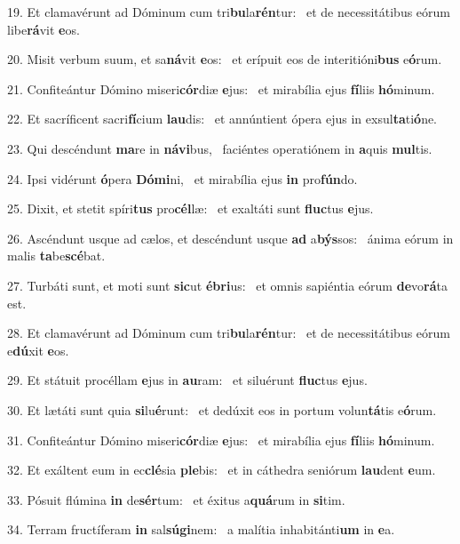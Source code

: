 19. Et clamavérunt ad Dóminum cum tri\textbf{bu}la\textbf{rén}tur: \ast\  et de necessitátibus eórum libe\textbf{rá}vit \textbf{e}os.\

20. Misit verbum suum, et sa\textbf{ná}vit \textbf{e}os: \ast\  et erípuit eos de interitióni\textbf{bus} e\textbf{ó}rum.\

21. Confiteántur Dómino miseri\textbf{cór}diæ \textbf{e}jus: \ast\  et mirabília ejus \textbf{fí}liis \textbf{hó}minum.\

22. Et sacríficent sacri\textbf{fí}cium \textbf{lau}dis: \ast\  et annúntient ópera ejus in exsul\textbf{ta}ti\textbf{ó}ne.\

23. Qui descéndunt \textbf{ma}re in \textbf{ná}\textbf{vi}bus, \ast\  faciéntes operatiónem in \textbf{a}quis \textbf{mul}tis.\

24. Ipsi vidérunt \textbf{ó}pera \textbf{Dó}\textbf{mi}ni, \ast\  et mirabília ejus \textbf{in} pro\textbf{fún}do.\

25. Dixit, et stetit spíri\textbf{tus} pro\textbf{cél}læ: \ast\  et exaltáti sunt \textbf{fluc}tus \textbf{e}jus.\

26. Ascéndunt usque ad cælos, et descéndunt usque \textbf{ad} a\textbf{býs}sos: \ast\  ánima eórum in malis \textbf{ta}be\textbf{scé}bat.\

27. Turbáti sunt, et moti sunt \textbf{sic}ut \textbf{é}\textbf{bri}us: \ast\  et omnis sapiéntia eórum \textbf{de}vo\textbf{rá}ta est.\

28. Et clamavérunt ad Dóminum cum tri\textbf{bu}la\textbf{rén}tur: \ast\  et de necessitátibus eórum e\textbf{dú}xit \textbf{e}os.\

29. Et státuit procéllam \textbf{e}jus in \textbf{au}ram: \ast\  et siluérunt \textbf{fluc}tus \textbf{e}jus.\

30. Et lætáti sunt quia \textbf{si}lu\textbf{é}runt: \ast\  et dedúxit eos in portum volun\textbf{tá}tis e\textbf{ó}rum.\

31. Confiteántur Dómino miseri\textbf{cór}diæ \textbf{e}jus: \ast\  et mirabília ejus \textbf{fí}liis \textbf{hó}minum.\

32. Et exáltent eum in ec\textbf{clé}sia \textbf{ple}bis: \ast\  et in cáthedra seniórum \textbf{lau}dent \textbf{e}um.\

33. Pósuit flúmina \textbf{in} de\textbf{sér}tum: \ast\  et éxitus a\textbf{quá}rum in \textbf{si}tim.\

34. Terram fructíferam \textbf{in} sal\textbf{sú}\textbf{gi}nem: \ast\  a malítia inhabitánti\textbf{um} in \textbf{e}a.\

